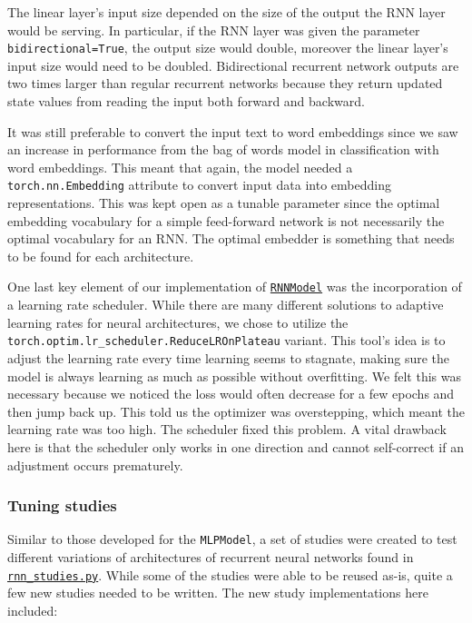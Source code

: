 The linear layer's input size depended on the size of the output the RNN layer would be serving. In particular, if the RNN layer was given the parameter \texttt{bidirectional=True}, the output size would double, moreover the linear layer's input size would need to be doubled. Bidirectional recurrent network outputs are two times larger than regular recurrent networks because they return updated state values from reading the input both forward and backward. 

It was still preferable to convert the input text to word embeddings since we saw an increase in performance from the bag of words model in classification with word embeddings. This meant that again, the model needed a \texttt{torch.nn.Embedding} attribute to convert input data into embedding representations. This was kept open as a tunable parameter since the optimal embedding vocabulary for a simple feed-forward network is not necessarily the optimal vocabulary for an RNN. The optimal embedder is something that needs to be found for each architecture. 

One last key element of our implementation of
\texttt{\href{https://github.uio.no/fabior/IN5550/blob/master/Oblig2/packages/ann_models.py}{RNNModel}}
was the incorporation of a learning rate scheduler. While there are many different solutions to adaptive learning rates for neural architectures, we chose to utilize the \texttt{torch.optim.lr\_scheduler.ReduceLROnPlateau} variant. This tool's idea is to adjust the learning rate every time learning seems to stagnate, making sure the model is always learning as much as possible without overfitting. We felt this was necessary because we noticed the loss would often decrease for a few epochs and then jump back up. This told us the optimizer was overstepping, which meant the learning rate was too high. The scheduler fixed this problem. A vital drawback here is that the scheduler only works in one direction and cannot self-correct if an adjustment occurs prematurely.

\subsubsection{Tuning studies}
\quad Similar to those developed for the \texttt{MLPModel}, a set of studies were created to test different variations of architectures of recurrent neural networks found in \texttt{\href{https://github.uio.no/fabior/IN5550/blob/master/Oblig2/packages/rnn\_studies.py}{rnn\_studies.py}}. While some of the studies were able to be reused as-is, quite a few new studies needed to be written. The new study implementations here included:

